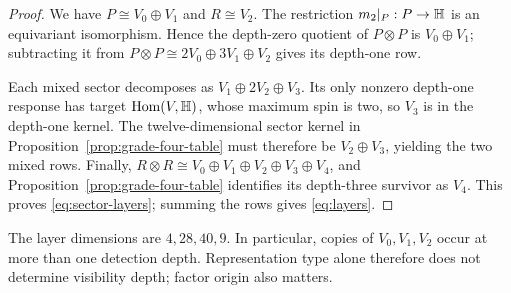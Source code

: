 \begin{proof}
We have $P\cong V_0\oplus V_1$ and $R\cong V_2$.  The restriction $m_2|_P:P\to\mathbb H$ is an equivariant isomorphism.  Hence the depth-zero quotient of $P\otimes P$ is $V_0\oplus V_1$; subtracting it from
$P\otimes P\cong2V_0\oplus3V_1\oplus V_2$ gives its depth-one row.

Each mixed sector decomposes as
$V_1\oplus2V_2\oplus V_3$.  Its only nonzero depth-one response has target
$\operatorname{Hom}(V,\mathbb H)$, whose maximum spin is two, so $V_3$ is in the depth-one kernel.  The twelve-dimensional sector kernel in Proposition~\ref{prop:grade-four-table} must therefore be $V_2\oplus V_3$, yielding the two mixed rows.  Finally,
$R\otimes R\cong V_0\oplus V_1\oplus V_2\oplus V_3\oplus V_4$, and Proposition~\ref{prop:grade-four-table} identifies its depth-three survivor as $V_4$.  This proves \eqref{eq:sector-layers}; summing the rows gives \eqref{eq:layers}.
\end{proof}

The layer dimensions are $4,28,40,9$.  In particular, copies of $V_0,V_1,V_2$ occur at more than one detection depth.  Representation type alone therefore does not determine visibility depth; factor origin also matters.
